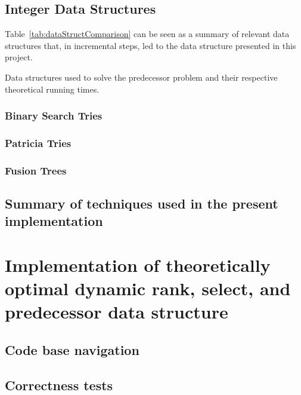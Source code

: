 \subsection{Integer Data Structures}

Table~\ref{tab:dataStructComparison} can be seen as a summary of relevant data structures that, in incremental steps, led to the data structure presented in this project.

\begin{table}[H]
\centering

\caption[Data structure comparison]{Data structures used to solve the predecessor problem and their respective theoretical running times.}
\label{tab:dataStructComparison}
\end{table}

\subsubsection{Binary Search Tries}

\subsubsection{Patricia Tries}

\subsubsection{Fusion Trees}

\subsection{Summary of techniques used in the present implementation}

\section{Implementation of theoretically optimal dynamic rank, select, and predecessor data structure}

\subsection{Code base navigation}

\subsection{Correctness tests}


